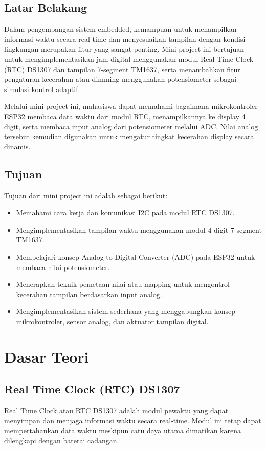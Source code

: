 \documentclass[12pt,a4paper]{article}
\begin{document}
\subsection{Latar Belakang}
Dalam pengembangan sistem embedded, kemampuan untuk menampilkan informasi waktu secara real-time dan menyesuaikan tampilan dengan kondisi lingkungan merupakan fitur yang sangat penting. Mini project ini bertujuan untuk mengimplementasikan jam digital menggunakan modul Real Time Clock (RTC) DS1307 dan tampilan 7-segment TM1637, serta menambahkan fitur pengaturan kecerahan atau dimming menggunakan potensiometer sebagai simulasi kontrol adaptif.

Melalui mini project ini, mahasiswa dapat memahami bagaimana mikrokontroler ESP32 membaca data waktu dari modul RTC, menampilkannya ke display 4 digit, serta membaca input analog dari potensiometer melalui ADC. Nilai analog tersebut kemudian digunakan untuk mengatur tingkat kecerahan display secara dinamis.

\subsection{Tujuan}
Tujuan dari mini project ini adalah sebagai berikut:
\begin{itemize}
    \item Memahami cara kerja dan komunikasi I2C pada modul RTC DS1307.
    \item Mengimplementasikan tampilan waktu menggunakan modul 4-digit 7-segment TM1637.
    \item Mempelajari konsep Analog to Digital Converter (ADC) pada ESP32 untuk membaca nilai potensiometer.
    \item Menerapkan teknik pemetaan nilai atau mapping untuk mengontrol kecerahan tampilan berdasarkan input analog.
    \item Mengimplementasikan sistem sederhana yang menggabungkan konsep mikrokontroler, sensor analog, dan aktuator tampilan digital.
\end{itemize}

\section{Dasar Teori}

\subsection{Real Time Clock (RTC) DS1307}
Real Time Clock atau RTC DS1307 adalah modul pewaktu yang dapat menyimpan dan menjaga informasi waktu secara real-time. Modul ini tetap dapat mempertahankan data waktu meskipun catu daya utama dimatikan karena dilengkapi dengan baterai cadangan.
\end{document}
